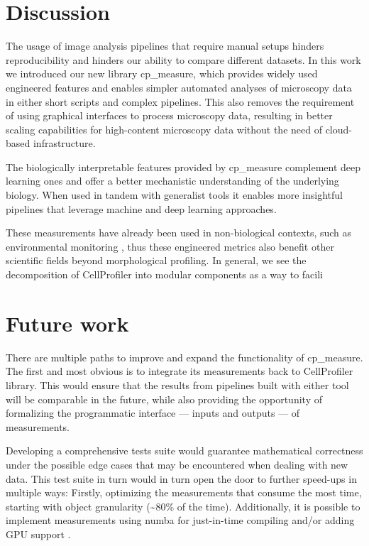 \documentclass{article}
\begin{document}
\section{Discussion}
\label{sec:orgf37b369}
The usage of image analysis pipelines that require manual setups hinders reproducibility and hinders our ability to compare different datasets. In this work we introduced our new library cp\_measure, which provides widely used engineered features and enables simpler automated analyses of microscopy data in either short scripts and complex pipelines. This also removes the requirement of using graphical interfaces to process microscopy data, resulting in better scaling capabilities for high-content microscopy data without the need of cloud-based infrastructure.

The biologically interpretable features provided by cp\_measure complement deep learning ones and offer a better mechanistic understanding of the underlying biology. When used in tandem with generalist tools it enables more insightful pipelines that leverage machine and deep learning approaches. 

These measurements have already been used in non-biological contexts, such as environmental monitoring \citep{ideharaExploringNileRed2025}, thus these engineered metrics also benefit other scientific fields beyond morphological profiling. In general, we see the decomposition of CellProfiler into modular components as a way to facili
\section{Future work}
\label{sec:org5cdbb12}
There are multiple paths to improve and expand the functionality of cp\_measure. The first and most obvious is to integrate its measurements back to CellProfiler library. This would ensure that the results from pipelines built with either tool will be comparable in the future, while also providing the opportunity of formalizing the programmatic interface --- inputs and outputs --- of measurements.

Developing a comprehensive tests suite would guarantee mathematical correctness under the possible edge cases that may be encountered when dealing with new data. This test suite in turn would in turn open the door to further speed-ups in multiple ways: Firstly, optimizing the measurements that consume the most time, starting with object granularity (\textasciitilde{}80\% of the time). Additionally, it is possible to implement measurements using numba for just-in-time compiling and/or adding GPU support \citep{lamNumbaLLVMbasedPython2015}.
\end{document}
